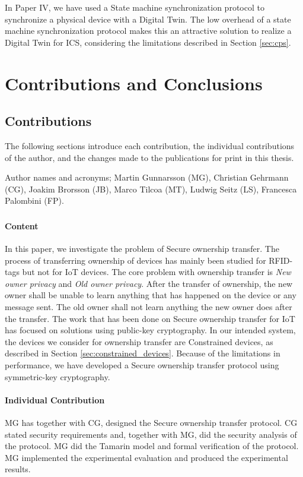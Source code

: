 In Paper IV, we have used a State machine synchronization protocol to synchronize a physical device with a Digital Twin. The low overhead of a state machine synchronization protocol makes this an attractive solution to realize a Digital Twin for ICS, considering the limitations described in Section \ref{sec:cps}.

\chapter{Contributions and Conclusions}
\label{ch:coc}
\section{Contributions}
The following sections introduce each contribution, the individual contributions of the author, and the changes made to the publications for print in this thesis.

Author names and acronyms; Martin Gunnarsson (MG), Christian Gehrmann (CG), Joakim Brorsson (JB), Marco Tilcoa (MT), Ludwig Seitz (LS), Francesca Palombini (FP).

\subsection{\paperItitle}
\subsubsection{Content}
In this paper, we investigate the problem of Secure ownership transfer. The process of transferring ownership of devices has mainly been studied for RFID-tags but not for IoT devices. The core problem with ownership transfer is \emph{New owner privacy} and \emph{Old owner privacy}. After the transfer of ownership, the new owner shall be unable to learn anything that has happened on the device or any message sent. The old owner shall not learn anything the new owner does after the transfer. 
The work that has been done on Secure ownership transfer for IoT has focused on solutions using public-key cryptography. 
In our intended system, the devices we consider for ownership transfer are Constrained devices, as described in Section \ref{sec:constrained_devices}. Because of the limitations in performance, we have developed a Secure ownership transfer protocol using symmetric-key cryptography.
\subsubsection{Individual Contribution}
MG has together with CG, designed the Secure ownership transfer protocol. CG stated security requirements and, together with MG, did the security analysis of the protocol. MG did the Tamarin model and formal verification of the protocol. MG implemented the experimental evaluation and produced the experimental results.
